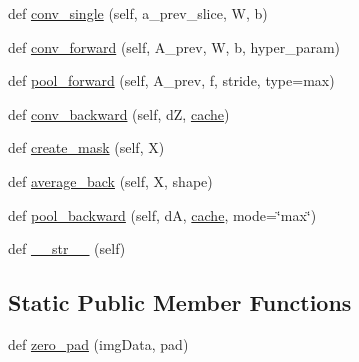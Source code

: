 \begin{DoxyCompactItemize}
\item 
def \mbox{\hyperlink{classnn_1_1nn_a9d0fccfef95f2c245476afed656e80f6}{conv\+\_\+single}} (self, a\+\_\+prev\+\_\+slice, W, b)
\item 
def \mbox{\hyperlink{classnn_1_1nn_ae778f37f71cdca8e917112deae9f4735}{conv\+\_\+forward}} (self, A\+\_\+prev, W, b, hyper\+\_\+param)
\item 
def \mbox{\hyperlink{classnn_1_1nn_a41278f302aa3d60fae1b5812d3ad3e5c}{pool\+\_\+forward}} (self, A\+\_\+prev, f, stride, type=\textquotesingle{}max\textquotesingle{})
\item 
def \mbox{\hyperlink{classnn_1_1nn_a3b35ba09acdfe74500c3cb1359162997}{conv\+\_\+backward}} (self, dZ, \mbox{\hyperlink{classnn_1_1nn_a1f75a6242fc9ee82ca2632e18979b4d3}{cache}})
\item 
def \mbox{\hyperlink{classnn_1_1nn_aae4f8d920993bf5668b04f3525215c6f}{create\+\_\+mask}} (self, X)
\item 
def \mbox{\hyperlink{classnn_1_1nn_aff147cb8f5d4919dd728fb0cbb6b0bbd}{average\+\_\+back}} (self, X, shape)
\item 
def \mbox{\hyperlink{classnn_1_1nn_aa5d886ef2ff91c73160129eb16d63d78}{pool\+\_\+backward}} (self, dA, \mbox{\hyperlink{classnn_1_1nn_a1f75a6242fc9ee82ca2632e18979b4d3}{cache}}, mode=\char`\"{}max\char`\"{})
\item 
def \mbox{\hyperlink{classnn_1_1nn_a1c967a0ae06ef2a7e8077cc9aa29aabc}{\+\_\+\+\_\+str\+\_\+\+\_\+}} (self)
\end{DoxyCompactItemize}
\subsection*{Static Public Member Functions}
\begin{DoxyCompactItemize}
\item 
def \mbox{\hyperlink{classnn_1_1nn_a0d8bdf9cacca85758429cebaa17336ef}{zero\+\_\+pad}} (img\+Data, pad)
\end{DoxyCompactItemize}
